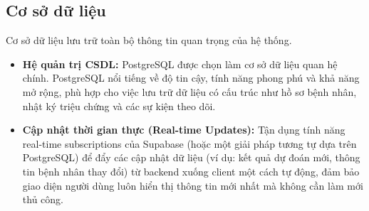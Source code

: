 \subsection{Cơ sở dữ liệu}

Cơ sở dữ liệu lưu trữ toàn bộ thông tin quan trọng của hệ thống.
\begin{itemize}
    \item \textbf{Hệ quản trị CSDL:} PostgreSQL được chọn làm cơ sở dữ liệu quan hệ chính. PostgreSQL nổi tiếng về độ tin cậy, tính năng phong phú và khả năng mở rộng, phù hợp cho việc lưu trữ dữ liệu có cấu trúc như hồ sơ bệnh nhân, nhật ký triệu chứng và các sự kiện theo dõi.
    \item \textbf{Cập nhật thời gian thực (Real-time Updates):} Tận dụng tính năng real-time subscriptions của Supabase (hoặc một giải pháp tương tự dựa trên PostgreSQL) để đẩy các cập nhật dữ liệu (ví dụ: kết quả dự đoán mới, thông tin bệnh nhân thay đổi) từ backend xuống client một cách tự động, đảm bảo giao diện người dùng luôn hiển thị thông tin mới nhất mà không cần làm mới thủ công.
\end{itemize}
